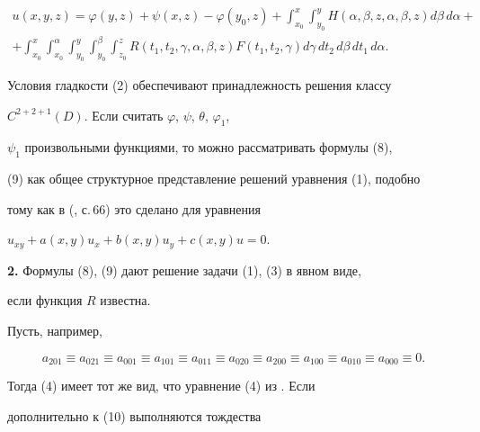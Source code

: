 \begin{multline} 


u(x,y,z)=\varphi(y,z)+\psi(x,z)-\varphi(y_0,z)+ 


\int^x_{x_0}\int^y_{y_0}H(\alpha,\beta,z,\alpha,\beta,z) 


d\beta\,d\alpha+ \\ 


% 


+\int^x_{x_0}\int^{\alpha}_{x_0}\int^y_{y_0} 


\int^{\beta}_{y_0}\int^z_{z_0}R(t_1,t_2,\gamma,\alpha,\beta,z) 


F(t_1,t_2,\gamma)d\gamma\,dt_2\,d\beta\,dt_1\,d\alpha. 


\end{multline} 


Условия гладкости (2) обеспечивают принадлежность решения классу 


$C^{2+2+1}(D)$. Если считать $\varphi$, $\psi$, $\theta$, $\varphi_1$, 


$\psi_1$ произвольными функциями, то можно рассматривать формулы (8), 


(9) как общее структурное представление решений уравнения (1), подобно 


тому как в (\cite{16}, с.\,66) это сделано для уравнения 


$u_{xy}+a(x,y)u_x+b(x,y)u_y+c(x,y)u=0$. 


\medskip 


 


{\bf 2.} Формулы (8), (9) дают решение задачи (1), (3) в явном виде, 


если функция $R$ известна. 


 


Пусть, например, 


\begin{equation} 


a_{201}\equiv a_{021}\equiv a_{001}\equiv a_{101}\equiv 


a_{011}\equiv a_{020}\equiv a_{200}\equiv a_{100}\equiv 


a_{010}\equiv a_{000}\equiv 0. 


\end{equation} 


Тогда (4) имеет тот же вид, что уравнение (4) из \cite{12}. Если 


дополнительно к (10) выполняются тождества 



